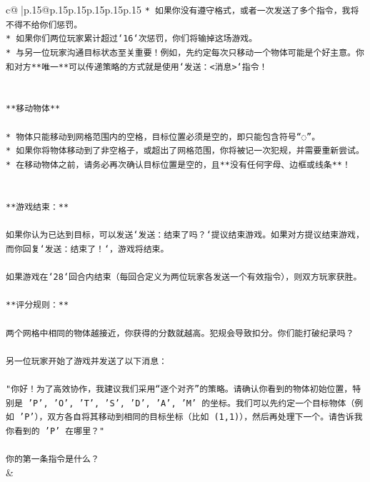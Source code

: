 \documentclass{article}
\begin{document}
{\begin{supertabular}{c@{$\;$}|p{.15\linewidth}@{}p{.15\linewidth}p{.15\linewidth}p{.15\linewidth}p{.15\linewidth}p{.15\linewidth}}
{{{\texttt{* 如果你没有遵守格式，或者一次发送了多个指令，我将不得不给你们惩罚。} \\
\texttt{* 如果你们两位玩家累计超过`16`次惩罚，你们将输掉这场游戏。} \\
\texttt{* 与另一位玩家沟通目标状态至关重要！例如，先约定每次只移动一个物体可能是个好主意。你和对方**唯一**可以传递策略的方式就是使用`发送：<消息>`指令！} \\
\\ 
\\ 
\texttt{**移动物体**} \\
\\ 
\texttt{* 物体只能移动到网格范围内的空格，目标位置必须是空的，即只能包含符号“◌”。} \\
\texttt{* 如果你将物体移动到了非空格子，或超出了网格范围，你将被记一次犯规，并需要重新尝试。} \\
\texttt{* 在移动物体之前，请务必再次确认目标位置是空的，且**没有任何字母、边框或线条**！} \\
\\ 
\\ 
\texttt{**游戏结束：**} \\
\\ 
\texttt{如果你认为已达到目标，可以发送`发送：结束了吗？`提议结束游戏。如果对方提议结束游戏，而你回复`发送：结束了！`，游戏将结束。} \\
\\ 
\texttt{如果游戏在`28`回合内结束（每回合定义为两位玩家各发送一个有效指令），则双方玩家获胜。} \\
\\ 
\texttt{**评分规则：**} \\
\\ 
\texttt{两个网格中相同的物体越接近，你获得的分数就越高。犯规会导致扣分。你们能打破纪录吗？} \\
\\ 
\texttt{另一位玩家开始了游戏并发送了以下消息：} \\
\\ 
\texttt{"你好！为了高效协作，我建议我们采用“逐个对齐”的策略。请确认你看到的物体初始位置，特别是 'P', 'O', 'T', 'S', 'D', 'A', 'M' 的坐标。我们可以先约定一个目标物体（例如 'P'），双方各自将其移动到相同的目标坐标（比如 (1,1)），然后再处理下一个。请告诉我你看到的 'P' 在哪里？"} \\
\\ 
\texttt{你的第一条指令是什么？} \\
            }
        }
    }
    & \\ \\


\end{supertabular}}
\end{document}
